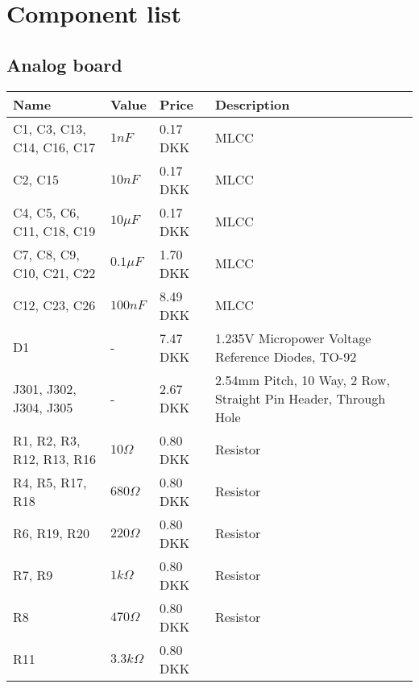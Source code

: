 \section{Component list}
\label{app:component_list}

\subsection{Analog board}
\begin{table}[H]
\centering
\small
\begin{tabular}{|p{4cm} p{1.5cm} p{2.2cm} p{6cm}|} \hline
\textbf{Name}              & \textbf{Value} & \textbf{Price}    & \textbf{Description} \\ \hline
C1, C3, C13, C14, C16, C17 & $1nF$          & 0.17 DKK          &     MLCC                           \\
C2, C15                    & $10nF$         & 0.17 DKK          &     MLCC                           \\
C4, C5, C6, C11, C18, C19  & $10\mu F$      & 0.17 DKK          &     MLCC                           \\
C7, C8, C9, C10, C21, C22  & $0.1\mu F$     & 1.70 DKK           &     MLCC                           \\
C12, C23, C26              & $100nF$        & 8.49 DKK          &     MLCC                           \\
D1                         & -              & 7.47 DKK
& 1.235V Micropower Voltage Reference Diodes, TO-92   \\
J301, J302, J304, J305     &  -             & 2.67 DKK
& 2.54mm Pitch, 10 Way, 2 Row, Straight Pin Header, Through Hole                               \\
R1, R2, R3, R12, R13, R16  & $10 \Omega$    & 0.80 DKK
& Resistor                                            \\
R4, R5, R17, R18           & $680 \Omega$   & 0.80 DKK
& Resistor                                            \\
R6, R19, R20               & $220 \Omega$   & 0.80 DKK
& Resistor                                            \\
R7, R9                     & $1k \Omega$    & 0.80 DKK
& Resistor                                            \\
R8                         & $470 \Omega$   & 0.80 DKK
& Resistor                                            \\
R11                        & $3.3k \Omega$  & 0.80 DKK

\end{tabular}
\end{table}
